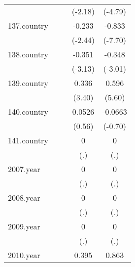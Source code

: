 {\begin{tabular}{l*{4}{c}}
            &                     &                     &     (-2.18)         &     (-4.79)         \\
[1em]
137.country &                     &                     &      -0.233\sym{*}  &      -0.833\sym{***}\\
            &                     &                     &     (-2.44)         &     (-7.70)         \\
[1em]
138.country &                     &                     &      -0.351\sym{**} &      -0.348\sym{**} \\
            &                     &                     &     (-3.13)         &     (-3.01)         \\
[1em]
139.country &                     &                     &       0.336\sym{***}&       0.596\sym{***}\\
            &                     &                     &      (3.40)         &      (5.60)         \\
[1em]
140.country &                     &                     &      0.0526         &     -0.0663         \\
            &                     &                     &      (0.56)         &     (-0.70)         \\
[1em]
141.country &                     &                     &           0         &           0         \\
            &                     &                     &         (.)         &         (.)         \\
[1em]
2007.year   &                     &                     &           0         &           0         \\
            &                     &                     &         (.)         &         (.)         \\
[1em]
2008.year   &                     &                     &           0         &           0         \\
            &                     &                     &         (.)         &         (.)         \\
[1em]
2009.year   &                     &                     &           0         &           0         \\
            &                     &                     &         (.)         &         (.)         \\
[1em]
2010.year   &                     &                     &       0.395\sym{***}&       0.863\sym{***}\\

\end{tabular}}
